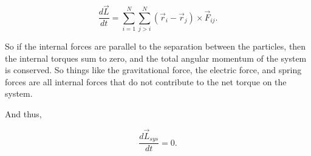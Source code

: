 \documentclass[11pt]{article}
\makeatletter
\newcommand{\boxspacing}{\kern\kvtcb@left@rule\kern\kvtcb@boxsep}
\newcommand{\prompt}[4]{
        {\ttfamily\llap{{\color{#2}[#3]:\hspace{3pt}#4}}\vspace{-\baselineskip}}
    }
\makeatother
\begin{document}
\[\dfrac{d\vec{L}}{dt} =\sum_{i=1}^N \sum_{j>i}^{N} \left(\vec{r}_i - \vec{r}_j\right)\times \vec{F}_{ij}.\]

So if the internal forces are parallel to the separation between the
particles, then the internal torques sum to zero, and the total angular
momentum of the system is conserved. So things like the gravitational
force, the electric force, and spring forces are all internal forces
that do not contribute to the net torque on the system.

And thus,

\[\dfrac{d\vec{L}_{sys}}{dt} = 0.\]

    \begin{tcolorbox}[breakable, size=fbox, boxrule=1pt, pad at break*=1mm,colback=cellbackground, colframe=cellborder]
\prompt{In}{incolor}{ }{\boxspacing}
\begin{Verbatim}[commandchars=\\\{\}]

\end{Verbatim}
\end{tcolorbox}

    \begin{tcolorbox}[breakable, size=fbox, boxrule=1pt, pad at break*=1mm,colback=cellbackground, colframe=cellborder]
\prompt{In}{incolor}{ }{\boxspacing}
\begin{Verbatim}[commandchars=\\\{\}]

\end{Verbatim}
\end{tcolorbox}

    


    
    
    
\end{document}
